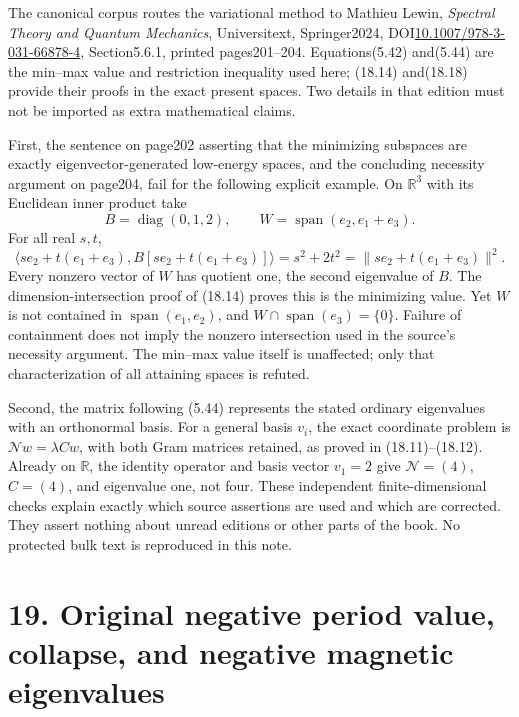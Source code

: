 \documentclass[
]{article}
\begin{document}
The canonical corpus routes the variational method to Mathieu Lewin,
\emph{Spectral Theory and Quantum Mechanics}, Universitext,
Springer2024,
DOI\href{https://doi.org/10.1007/978-3-031-66878-4}{10.1007/978-3-031-66878-4},
Section5.6.1, printed pages201--204. Equations(5.42) and(5.44) are the
min--max value and restriction inequality used here; (18.14) and(18.18)
provide their proofs in the exact present spaces. Two details in that
edition must not be imported as extra mathematical claims.

First, the sentence on page202 asserting that the minimizing subspaces
are exactly eigenvector-generated low-energy spaces, and the concluding
necessity argument on page204, fail for the following explicit example.
On \(\mathbb R^3\) with its Euclidean inner product take \[
B=\operatorname{diag}(0,1,2),\qquad
W=\operatorname{span}(e_2,e_1+e_3).
\] For all real \(s,t\), \[
\langle se_2+t(e_1+e_3),B[se_2+t(e_1+e_3)]\rangle
 =s^2+2t^2=\|se_2+t(e_1+e_3)\|^2.                           \tag{18.19}
\] Every nonzero vector of \(W\) has quotient one, the second eigenvalue
of \(B\). The dimension-intersection proof of (18.14) proves this is the
minimizing value. Yet \(W\) is not contained in
\(\operatorname{span}(e_1,e_2)\), and
\(W\cap\operatorname{span}(e_3)=\{0\}\). Failure of containment does not
imply the nonzero intersection used in the source's necessity argument.
The min--max value itself is unaffected; only that characterization of
all attaining spaces is refuted.

Second, the matrix following (5.44) represents the stated ordinary
eigenvalues with an orthonormal basis. For a general basis \(v_i\), the
exact coordinate problem is \(\mathcal Nw=\lambda Cw\), with both Gram
matrices retained, as proved in (18.11)--(18.12). Already on
\(\mathbb R\), the identity operator and basis vector \(v_1=2\) give
\(\mathcal N=(4)\), \(C=(4)\), and eigenvalue one, not four. These
independent finite-dimensional checks explain exactly which source
assertions are used and which are corrected. They assert nothing about
unread editions or other parts of the book. No protected bulk text is
reproduced in this note.

\section{19. Original negative period value, collapse, and negative
magnetic
eigenvalues}\label{original-negative-period-value-collapse-and-negative-magnetic-eigenvalues}
\end{document}
